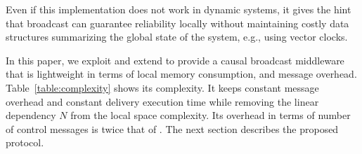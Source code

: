 Even if this implementation does not work in dynamic systems, it gives the hint
that broadcast can guarantee reliability locally without maintaining costly data
structures summarizing the global state of the system, e.g., using vector
clocks.




In this paper, we exploit and extend \PCBROADCAST to provide a causal broadcast
middleware that is lightweight in terms of local memory consumption, and message
overhead. Table~\ref{table:complexity} shows its complexity. It keeps constant
message overhead and constant delivery execution time while removing the linear
dependency $N$ from the local space complexity. Its overhead in terms of number
of control messages is twice that of \PCBROADCAST.
The next section describes the proposed protocol.


